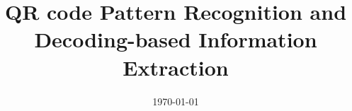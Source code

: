 \documentclass[a4paper, 11pt, oneside]{Thesis}  %
\begin{document}
\frontmatter      %

\title  {QR code Pattern Recognition and Decoding-based Information Extraction }
\addresses  {\groupname\\\deptname\\\univname}  %
\date       {\today}
\subject    {}
\keywords   {}

\maketitle


\fancyhead{}  %
\rhead{\thepage}  %
\lhead{}  %

\pagestyle{fancy}  %
\end{document}
